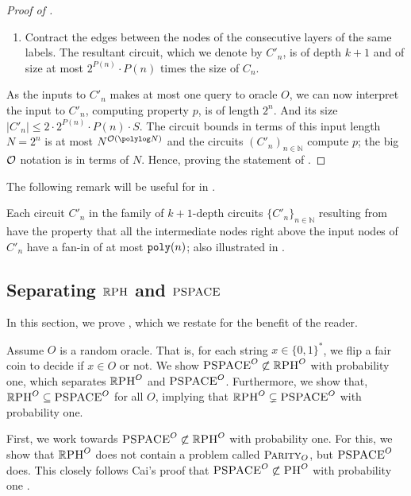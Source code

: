 \documentclass{article}
\begin{document}
\begin{proof}[Proof of ]
\begin{enumerate}
    \item Contract the edges between the nodes of the consecutive layers of the same labels. The resultant circuit, which we denote by $C'_n$, is of depth $k+1$ and of size at most $2^{P(n)} \cdot P(n)$ times the size of $C_n$.
\end{enumerate}
As the inputs to $C'_n$ makes at most one query to oracle $O$, we can now interpret the input to $C'_n$, computing property $p$, is of length $2^n$. And its size $|C'_n| \leq 2 \cdot 2^{P(n)} \cdot P(n) \cdot S$. The circuit bounds in terms of this input length $N=2^n$ is at most $N^{\bigO(\polylog N)}$ and the circuits $(C'_n)_{n \in \mathbb{N}}$ compute $p$; the big $\mathcal{O}$ notation is in terms of $N$. Hence, proving the statement of .
\end{proof}

The following remark will be useful for  in .
\begin{remark}
\label{rem:FaninAtmostPoly} Each circuit $C'_n$ in the family of $k+1$-depth circuits $\{C'_n\}_{n \in \mathbb{N}}$ resulting from  have the property that all the intermediate nodes right above the input nodes of $C'_n$ have a fan-in of at most $\texttt{poly}(n)$; also illustrated in .  
\end{remark}

\subsection{Separating $\mathbb{R}\textsc{PH}$ and $\textsc{PSPACE}$}
In this section, we prove , which we restate for the benefit of the reader.

\PSPACEnotRPH* 

Assume $O$ is a random oracle.
That is, for each string $x\in \{0,1\}^*$, we flip a fair coin to decide if $x\in O$ or not.
We show $\textsc{PSPACE}^O \not\subset \mathbb{R}\textsc{PH}^O$ with probability one, which separates $\mathbb{R}\textsc{PH}^O$ and $\textsc{PSPACE}^O$.
Furthermore, we show that, $\mathbb{R}\textsc{PH}^O \subseteq \textsc{PSPACE}^O$ for all $O$, implying that $\mathbb{R}\textsc{PH}^O \subsetneq \textsc{PSPACE}^O$ with probability one.

First, we work towards $\textsc{PSPACE}^O \not\subset \mathbb{R}\textsc{PH}^O$ with probability one.
For this, we show that $\mathbb{R}\textsc{PH}^O$ does not contain a problem called $\textsc{Parity}_O$, but $\textsc{PSPACE}^O$ does.
This closely follows Cai's proof that $\textsc{PSPACE}^O\not\subset\textsc{PH}^O$ with probability one \cite{Cai86}.
\end{document}

